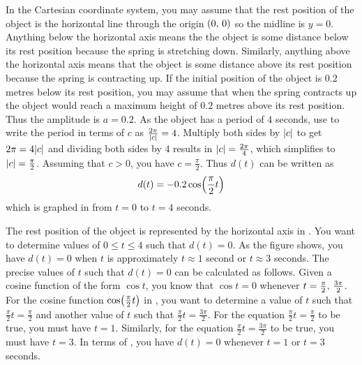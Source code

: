 \documentclass[a4paper,oneside,12pt]{article}
\begin{document}
\begin{problem}
{\begin{solution}
In the Cartesian coordinate system, you may assume that the rest
position of the object is the horizontal line through the origin
$\left\lparen{0},\, {0}\right\rparen$ so the midline is $y = 0$.  Anything below the
horizontal axis means the the object is some distance below its rest
position because the spring is stretching down.  Similarly, anything
above the horizontal axis means that the object is some distance above
its rest position because the spring is contracting up.  If the
initial position of the object is $0.2$ metres below its rest
position, you may assume that when the spring contracts up the object
would reach a maximum height of $0.2$ metres above its rest position.
Thus the amplitude is $a = 0.2$.  As the object has a period of $4$
seconds, use  to
write the period in terms of $c$ as
$\frac{2\pi}{\lvert c\rvert} = 4$.  Multiply both sides by
$\lvert c\rvert$ to get $2\pi = 4\lvert c\rvert$ and dividing
both sides by $4$ results in $\lvert c\rvert = \frac{2\pi}{4}$,
which simplifies to $\lvert c\rvert = \frac{\pi}{2}$.  Assuming
that $c > 0$, you have $c = \frac{\pi}{2}$.  Thus $d(t)$ can be
written as
\begin{equation}
\label{eqn:trigonometric:spring_displacement}
d(t)
=
-0.2 \cosp{\frac{\pi}{2} t}
\end{equation}
which is graphed in 
from $t = 0$ to $t = 4$ seconds.

The rest position of the object is represented by the horizontal axis
in .  You want to
determine values of $0 \leq t \leq 4$ such that $d(t) = 0$.  As the
figure shows, you have $d(t) = 0$ when $t$ is approximately
$t \approx 1$ second or $t \approx 3$ seconds.  The precise values of
$t$ such that $d(t) = 0$ can be calculated as follows.  Given a cosine
function of the form $\cos t$, you know that $\cos t = 0$ whenever
$t = {\frac{\pi}{2}},\, {\frac{3\pi}{2}}$.  For the cosine function
$\cosp{\frac{\pi}{2} t}$ in
, you want to
determine a value of $t$ such that $\frac{\pi}{2} t = \frac{\pi}{2}$
and another value of $t$ such that
$\frac{\pi}{2} t = \frac{3\pi}{2}$.  For the equation
$\frac{\pi}{2} t = \frac{\pi}{2}$ to be true, you must have $t = 1$.
Similarly, for the equation $\frac{\pi}{2} t = \frac{3\pi}{2}$ to be
true, you must have $t = 3$.  In terms of
, you have
$d(t) = 0$ whenever $t = 1$ or $t = 3$ seconds.
\end{solution}
}{}


\end{problem}
\end{document}
